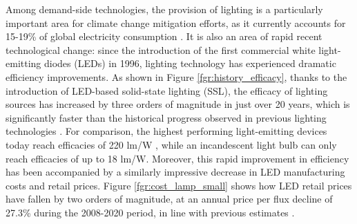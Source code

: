 \documentclass[parskip=full]{article}
\begin{document}
Among demand-side technologies, the provision of lighting is a particularly important area for climate change mitigation efforts, as it currently   accounts for 15-19\% of global electricity consumption \cite{Zissis2016,doe_electricity}. It is also an area of rapid recent technological change: since the introduction of the first commercial white light-emitting diodes (LEDs) in 1996, lighting technology has experienced dramatic efficiency improvements.  As shown in Figure \ref{fgr:history_efficacy}, thanks to the introduction of LED-based solid-state lighting (SSL), the efficacy of lighting sources has increased by three orders of magnitude in just over 20 years, which is significantly faster than the historical progress observed in previous lighting technologies \cite{weinold2021quantifying}. For comparison, the highest performing light-emitting devices today reach efficacies of 220 lm/W \cite{lumistrips2021mid}, while an incandescent light bulb can only reach efficacies of up to 18 lm/W. Moreover, this rapid improvement in efficiency has been accompanied by a similarly impressive decrease in LED manufacturing costs and retail prices. Figure \ref{fgr:cost_lamp_small} shows how LED retail prices have fallen by two orders of magnitude, at an annual price per flux decline of 27.3\% during the 2008-2020 period, in line with previous estimates \cite{Gerke2020}.
\end{document}
